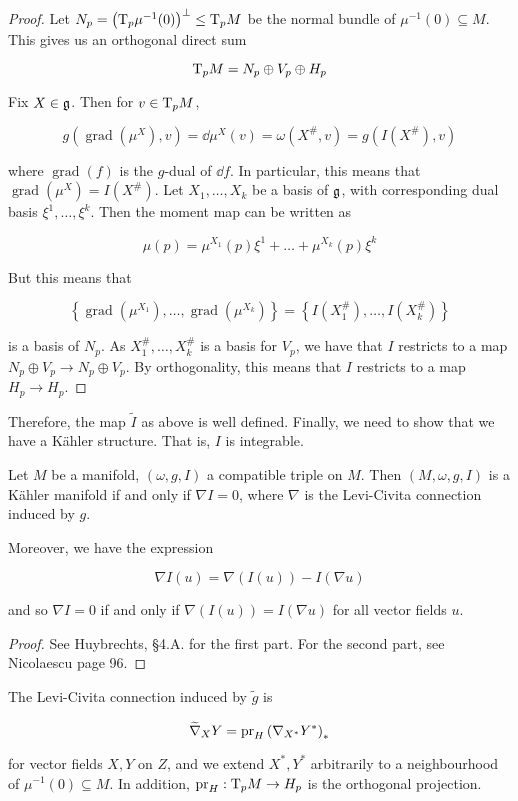 \documentclass{article}
\renewcommand{\tilde}{\widetilde}
\DeclareMathOperator{\gr}{grad}
\begin{document}
\begin{proof}
    Let \(N_p = \left(\mathrm{T}_p\mu^{-1}(0)\right)^\perp \le \mathrm{T}_pM\) be the normal bundle of \(\mu^{-1}(0) \subseteq M\). This gives us an orthogonal direct sum

    \[\mathrm{T}_p M = N_p \oplus V_p \oplus H_p\]

    Fix \(X \in \mathfrak{g}\). Then for \(v \in \mathrm{T}_pM\),

    \[g(\gr(\mu^X), v) = \dd\mu^X(v) = \omega(X^\#, v) = g(I(X^\#), v)\]

    where \(\gr(f)\) is the \(g\)-dual of \(\dd f\). In particular, this means that \(\gr(\mu^X) = I(X^\#)\). Let \(X_1, \dots, X_k\) be a basis  of \(\mathfrak{g}\), with corresponding dual basis \(\xi^1, \dots, \xi^k\). Then the moment map can be written as

    \[\mu(p) = \mu^{X_1}(p)\xi^1 + \dots + \mu^{X_k}(p)\xi^k\]

    But this means that

    \[\left\{\gr(\mu^{X_1}), \dots, \gr(\mu^{X_k})\right\} = \left\{I(X_1^\#), \dots, I(X_k^\#)\right\}\]

    is a basis of \(N_p\). As \(X_1^\#, \dots, X_k^\#\) is a basis for \(V_p\), we have that \(I\) restricts to a map \(N_p \oplus V_p \to N_p \oplus V_p\). By orthogonality, this means that \(I\) restricts to a map \(H_p \to H_p\).
\end{proof}

Therefore, the map \(\tilde I\) as above is well defined. Finally, we need to show that we have a K\"ahler structure. That is, \(I\) is integrable.

\begin{lemma*}
    Let \(M\) be a manifold, \((\omega, g, I)\) a compatible triple on \(M\). Then \((M, \omega, g, I)\) is a K\"ahler manifold if and only if \(\nabla I = 0\), where \(\nabla\) is the Levi-Civita connection induced by \(g\).

    Moreover, we have the expression

    \[\nabla I(u) = \nabla(I(u)) - I(\nabla u)\]

    and so \(\nabla I = 0\) if and only if \(\nabla(I(u)) = I(\nabla u)\) for all vector fields \(u\).
\end{lemma*}

\begin{proof}
    See Huybrechts, \S 4.A. for the first part. For the second part, see Nicolaescu page 96.
\end{proof}

\begin{lemma*}
    The Levi-Civita connection induced by \(\tilde g\) is

    \[\tilde\nabla_XY = \pr_H\left(\nabla_{X^*}Y^*\right)_*\]

    for vector fields \(X, Y\) on \(Z\), and we extend \(X^*, Y^*\) arbitrarily to a neighbourhood of \(\mu^{-1}(0) \subseteq M\). In addition, \(\operatorname{pr}_H : \mathrm{T}_p M \to H_p\) is the orthogonal projection.
\end{lemma*}
\end{document}
